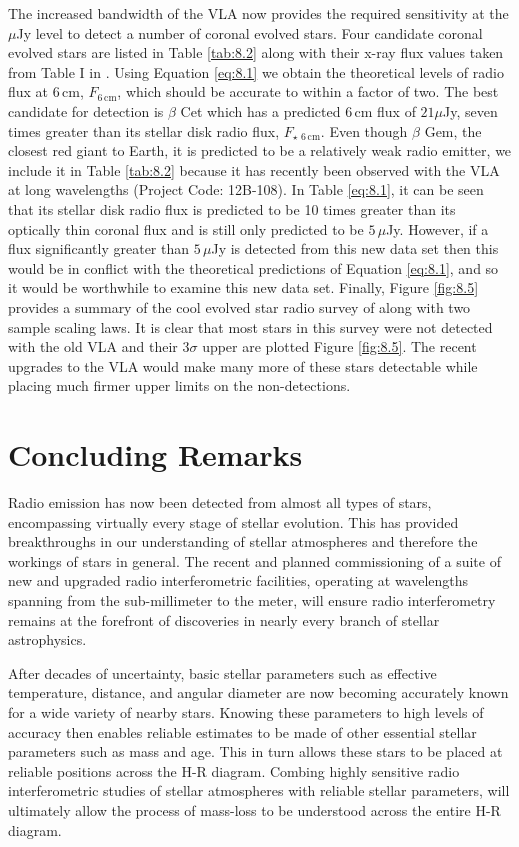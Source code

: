 The increased bandwidth of the VLA now provides the required sensitivity at the $\mu$Jy level to detect a number of coronal evolved stars. Four candidate coronal evolved stars are listed in Table \ref{tab:8.2} along with their x-ray flux values taken from Table I in \cite{drake_1986}. Using Equation \ref{eq:8.1} we obtain the theoretical levels of radio flux at 6\,cm, $F_{6\,\mathrm{cm}}$,  which should be accurate to within a factor of two. The best candidate for detection is $\beta$ Cet which has a predicted 6\,cm flux of $21\mu$Jy, seven times greater than its stellar disk radio flux, $F_{\star \,\,6\,\mathrm{cm}}$. Even though $\beta$ Gem, the closest red giant to Earth, it is predicted to be a relatively weak radio emitter, we include it in Table \ref{tab:8.2} because it has recently been observed with the VLA at long wavelengths (Project Code: 12B-108). In Table \ref{eq:8.1}, it can be seen that its stellar disk radio flux is predicted to be 10 times greater than its optically thin coronal flux and is still only predicted to be $5\,\mu$Jy. However, if a flux significantly greater than $5\,\mu$Jy is detected from this new data set then this would be in conflict with the theoretical predictions of Equation \ref{eq:8.1}, and so it would be worthwhile to examine this new data set. Finally, Figure \ref{fig:8.5} provides a summary of the cool evolved star radio survey of \cite{drake_1986} along with two sample scaling laws. It is clear that most stars in this survey were not detected with the old VLA and their $3\sigma$ upper are plotted Figure \ref{fig:8.5}. The recent upgrades to the VLA would make many more of these stars detectable while placing much firmer upper limits on the non-detections. 

\section{Concluding Remarks}\label{sec:8.3}
Radio emission has now been detected from almost all types of stars, encompassing virtually every stage of stellar evolution. This has provided breakthroughs in our understanding of stellar atmospheres and therefore the workings of stars in general. The recent and planned commissioning of a suite of new and upgraded radio interferometric facilities, operating at wavelengths spanning from the sub-millimeter to the meter, will ensure radio interferometry remains at the forefront of discoveries in nearly every branch of stellar astrophysics. 

After decades of uncertainty, basic stellar parameters such as effective temperature, distance, and angular diameter are now becoming accurately known for a wide variety of nearby stars. Knowing these parameters to high levels of accuracy then enables reliable estimates to be made of other essential stellar parameters such as mass and age. This in turn allows these stars to be placed at reliable positions across the H-R diagram. Combing highly sensitive radio interferometric studies of stellar atmospheres with reliable stellar parameters, will ultimately allow the process of mass-loss to be understood across the entire H-R diagram.

